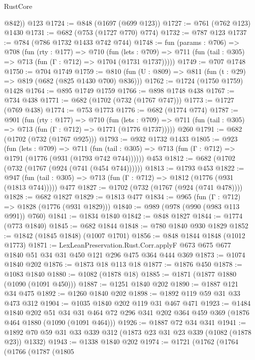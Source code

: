 \begin{lexlean}{RustCore}
\begin{coremodule}
        @842))
    @123
@1724 := @848 (@1697 (@699 @123))
@1727 := @761 (@762 @123) @1430
@1731 := @682 (@753 (@1727 @770) @774)
@1732 := @787 @123
@1737 := @784 (@786 @1732 @1433 @742 @744)
@1748 := fun (params : @706) =>
  @708
    (fun (rty : @177) =>
    @710
      (fun (lets : @709) =>
      @711 (fun (tail : @305) => @713 (fun (Γ : @712) => @1704 (@1731 @1737)))))
@1749 := @707 @1748
@1750 := @704 @1749
@1759 := @810 (fun (U : @809) => @811 (fun (t : @29) => @819 (@682 (@825 @1430 @700) @836)))
@1762 := @1724 (@1750 @1759) @1428
@1764 := @895 @1749 @1759
@1766 := @898 @1748 @438
@1767 := @734 @438
@1771 := @682 (@1702 (@732 (@1767 @747)))
@1773 := @1727 (@769 @438)
@1774 := @753 @1773
@1776 := @682 (@1774 @774)
@1787 := @901
    (fun (rty : @177) =>
    @710
      (fun (lets : @709) =>
      @711 (fun (tail : @305) => @713 (fun (Γ : @712) => @1771 (@1776 @1737)))))
    @260
@1791 := @682 (@1702 (@732 (@1767 @925)))
@1793 := @932 @1732 @1433
@1805 := @923
    (fun (lets : @709) =>
    @711 (fun (tail : @305) => @713 (fun (Γ : @712) => @1791 (@1776 (@931 (@1793 @742 @744))))))
    @453
@1812 := @682 (@1702 (@732 (@1767 (@924 (@741 (@454 @744))))))
@1813 := @1793 @453
@1822 := @947 (fun (tail : @305) => @713 (fun (Γ : @712) => @1812 (@1776 (@931 (@1813 @744))))) @477
@1827 := @1702 (@732 (@1767 (@924 (@741 @478))))
@1828 := @682 @1827
@1829 := @1813 @477
@1834 := @965 (fun (Γ : @712) => @1828 (@1776 (@931 @1829)))
@1840 := @989 (@978 (@990 (@983 @113 @991)) @760)
@1841 := @1834 @1840
@1842 := @848 @1827
@1844 := @1774 (@773 @1840)
@1845 := @682 @1844
@1848 := @780 @1840 @930 @1829
@1852 := @1842 (@1845 @1848) (@1007 @1701)
@1856 := @848 @1844 @1848 (@1012 @1773)
@1871 := LexLeanPreservation.Rust.Corr.applyF
    @673
    @675
    @677
    @1840
    @51
    @34
    @31
    @450
    @121
    @296
    @475
    @364
    @444
    @369
@1873 := @1074 @1840 @202
@1876 := @1873 @18 @113 @18
@1877 := @1876 @450
@1878 := @1083 @1840
@1880 := @1082 (@1878 @18)
@1885 := @1871 (@1877 @1880 (@1090 (@1091 @450)))
@1887 := @1251 @1840 @202
@1890 := @1887 @121 @34 @475
@1892 := @1260 @1840 @202
@1898 := @1892 @119 @59 @31 @33 @473 @312
@1904 := @1035 @1840 @202 @119 @31 @467 @471
@1923 := @1484
    @1840
    @202
    @51
    @34
    @31
    @464
    @72
    @296
    @341
    @202
    @364
    @459
    @369
    (@1876 @464 @1880 (@1090 (@1091 @464)))
@1926 := @1887 @72 @34 @341
@1941 := @1892 @70 @59 @31 @33 @339 @312 (@1873 @23 @31 @23 @339 (@1082 (@1878 @23)) @1332)
@1943 := @1338 @1840 @202
@1974 := @1721
    (@1762
      (@1764
        (@1766
          (@1787
            (@1805

\end{coremodule}
\end{lexlean}
